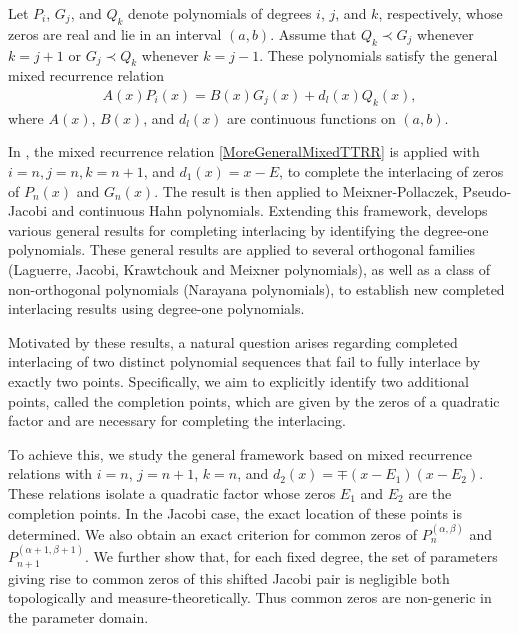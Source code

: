 \documentclass[final,3p,times,12pt]{elsarticle}
\numberwithin{equation}{section}  %
\begin{document}
	Let $P_i$, $G_j$, and $Q_k$ denote polynomials of degrees $i$, $j$, and $k$, respectively, whose zeros are real and lie in an interval $(a,b)$. Assume that $ Q_k\prec G_j $ whenever $k=j+1$ or $G_j \prec Q_k$ whenever $k=j-1$. These polynomials satisfy the general mixed recurrence relation
	\begin{align}\label{MoreGeneralMixedTTRR}
		A(x)P_i(x)=B(x)G_j(x)+d_l(x)Q_k(x),
	\end{align}
	where $A(x)$, $B(x)$, and $d_l(x)$ are continuous functions on $(a,b)$.  
	
	In \cite[Theorem 2.1]{Jooste-Jordaan-Numeralg-2025}, the mixed recurrence relation \eqref{MoreGeneralMixedTTRR} is applied with $i=n, j=n, k=n+1$, and $d_1(x)=x-E$, to complete the interlacing of zeros of  $P_n(x)$ and $G_n(x)$. The result is then applied to Meixner-Pollaczek, Pseudo-Jacobi and continuous Hahn polynomials. Extending this framework, \cite{Jordaan-Kumar-onepoint-2026} develops various general results for completing interlacing by identifying the degree-one polynomials. These general results are applied to several orthogonal families (Laguerre, Jacobi, Krawtchouk and Meixner polynomials), as well as a class of non-orthogonal polynomials (Narayana polynomials), to establish new completed interlacing results using degree-one polynomials.
	
	Motivated by these results, a natural question arises regarding completed interlacing of two distinct polynomial sequences that fail to fully interlace by exactly two points. Specifically, we aim to explicitly identify two additional points, called the completion points, which are given by the zeros of a quadratic factor and are necessary for completing the interlacing. 
	
To achieve this, we study the general framework based on mixed recurrence relations with $i=n$, $j=n+1$, $k=n$, and $d_2(x)=\mp(x-E_1)(x-E_2)$. These relations isolate a quadratic factor whose zeros $E_1$ and $E_2$ are the completion points.  In the Jacobi case, the exact location of these points is determined. 	We also obtain an exact criterion for common zeros of
			$P_n^{(\alpha,\beta)}$ and $P_{n+1}^{(\alpha+1,\beta+1)}$.  We further show
			that, for each fixed degree, the set of parameters giving rise to common zeros
			of this shifted Jacobi pair is negligible both topologically and
			measure-theoretically.  Thus common zeros are non-generic in the parameter
			domain.
		
\end{document}
